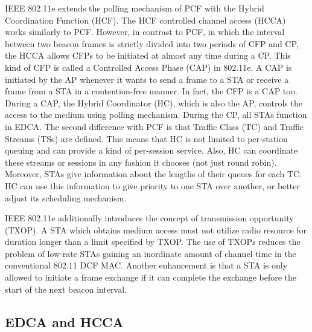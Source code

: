 IEEE 802.11e extends the polling mechanism of PCF with the Hybrid Coordination Function (HCF). The HCF controlled channel access (HCCA) works similarly to PCF. However, in contrast to PCF, in which the interval between two beacon frames is strictly divided into two periods of CFP and CP, the HCCA allows CFPs to be initiated at almost any time during a CP. This kind of CFP is called a Controlled Access Phase (CAP) in 802.11e. A CAP is initiated by the AP whenever it wants to send a frame to a STA or receive a frame from a STA in a contention-free manner. In fact, the CFP is a CAP too. During a CAP, the Hybrid Coordinator (HC), which is also the AP, controls the access to the medium using polling mechanism. During the CP, all STAs function in EDCA. The second difference with PCF is that Traffic Class (TC) and Traffic Streams (TSs) are defined. This means that HC is not limited to per-station queuing and can provide a kind of per-session service. Also, HC can coordinate these streams or sessions in any fashion it chooses (not just round robin). Moreover, STAs give information about the lengths of their queues for each TC. HC can use this information to give priority to one STA over another, or better adjust its scheduling mechanism.

IEEE 802.11e additionally introduces the concept of transmission opportunity (TXOP). A STA which obtains medium access must not utilize radio resource for duration longer than a limit specified by TXOP. The use of TXOPs reduces the problem of low-rate STAs gaining an inordinate amount of channel time in the conventional 802.11 DCF MAC. Another enhancement is that a STA is only allowed to initiate a frame exchange if it can complete the exchange before the start of the next beacon interval.

\subsection{EDCA and HCCA}
\label{edca-hcca}

